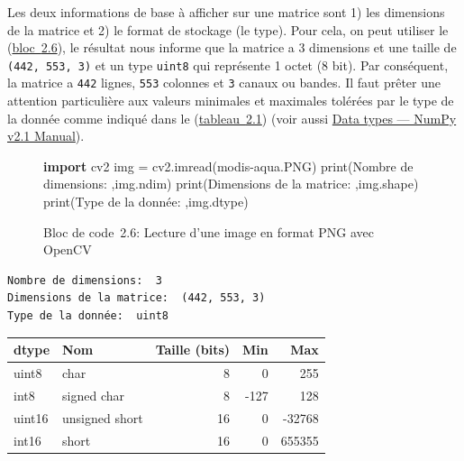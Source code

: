 \documentclass[
]{article}
\newenvironment{Shaded}{}{}
\newcommand{\BuiltInTok}[1]{\textcolor[rgb]{0.00,0.50,0.00}{#1}}
\newcommand{\ImportTok}[1]{\textcolor[rgb]{0.00,0.50,0.00}{\textbf{#1}}}
\newcommand{\NormalTok}[1]{#1}
\newcommand{\OperatorTok}[1]{\textcolor[rgb]{0.40,0.40,0.40}{#1}}
\newcommand{\StringTok}[1]{\textcolor[rgb]{0.25,0.44,0.63}{#1}}
\begin{document}
Les deux informations de base à afficher sur une matrice sont 1) les
dimensions de la matrice et 2) le format de stockage (le type). Pour
cela, on peut utiliser le (\hyperref[lst-numpyshape]{bloc~{2.6}}), le
résultat nous informe que la matrice a 3 dimensions et une taille de
\texttt{(442,\ 553,\ 3)} et un type \texttt{uint8} qui représente 1
octet (8 bit). Par conséquent, la matrice a \texttt{442} lignes,
\texttt{553} colonnes et \texttt{3} canaux ou bandes. Il faut prêter une
attention particulière aux valeurs minimales et maximales tolérées par
le type de la donnée comme indiqué dans le
(\hyperref[tbl-numpytype]{tableau~{2.1}}) (voir aussi
\href{https://numpy.org/doc/stable/user/basics.types.html}{Data types
--- NumPy v2.1 Manual}).

\label{0b232cfc}
\label{lst-numpyshape}
\begin{figure}
\centering
{}\label{lst-numpyshape}
\begin{Shaded}
\begin{Highlighting}[]
\ImportTok{import}\NormalTok{ cv2}
\NormalTok{img }\OperatorTok{=}\NormalTok{ cv2.imread(}\StringTok{\textquotesingle{}modis{-}aqua.PNG\textquotesingle{}}\NormalTok{)}
\BuiltInTok{print}\NormalTok{(}\StringTok{\textquotesingle{}Nombre de dimensions: \textquotesingle{}}\NormalTok{,img.ndim)}
\BuiltInTok{print}\NormalTok{(}\StringTok{\textquotesingle{}Dimensions de la matrice: \textquotesingle{}}\NormalTok{,img.shape)}
\BuiltInTok{print}\NormalTok{(}\StringTok{\textquotesingle{}Type de la donnée: \textquotesingle{}}\NormalTok{,img.dtype)}
\end{Highlighting}
\end{Shaded}
\caption{Bloc de code~2.6: Lecture d'une image en format PNG avec
OpenCV}
\end{figure}

\begin{verbatim}
Nombre de dimensions:  3
Dimensions de la matrice:  (442, 553, 3)
Type de la donnée:  uint8
\end{verbatim}

\label{tbl-numpytype}
\begin{longtable}[]{@{}llrrr@{}}
\toprule\noalign{}
dtype & Nom & Taille (bits) & Min & Max \\
\midrule\noalign{}
\endhead
\bottomrule\noalign{}
\endlastfoot
uint8 & char & 8 & 0 & 255 \\
int8 & signed char & 8 & -127 & 128 \\
uint16 & unsigned short & 16 & 0 & -32768 \\
int16 & short & 16 & 0 & 655355 \\
\end{longtable}
\end{document}

